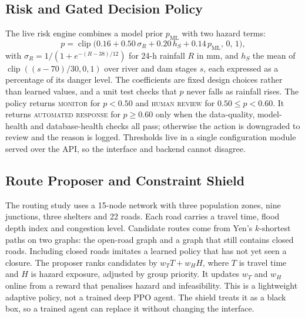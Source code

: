 \documentclass[conference]{IEEEtran}
\begin{document}
\subsection{Risk and Gated Decision Policy}
The live risk engine combines a model prior $p_{\mathrm{ML}}$ with two hazard terms:
\begin{equation}
p=\operatorname{clip}\big(0.16+0.50\,\sigma_R+0.20\,h_S+0.14\,p_{\mathrm{ML}},\,0,\,1\big),
\label{eq:risk}
\end{equation}
with $\sigma_R=1/(1+e^{-(R-38)/12})$ for 24-h rainfall $R$ in mm, and $h_S$ the mean of $\operatorname{clip}((s-70)/30,0,1)$ over river and dam stages $s$, each expressed as a percentage of its danger level. The coefficients are fixed design choices rather than learned values, and a unit test checks that $p$ never falls as rainfall rises. The policy returns \textsc{monitor} for $p<0.50$ and \textsc{human review} for $0.50\le p<0.60$. It returns \textsc{automated response} for $p\ge0.60$ only when the data-quality, model-health and database-health checks all pass; otherwise the action is downgraded to review and the reason is logged. Thresholds live in a single configuration module served over the API, so the interface and backend cannot disagree.

\subsection{Route Proposer and Constraint Shield}
The routing study uses a 15-node network with three population zones, nine junctions, three shelters and 22 roads. Each road carries a travel time, flood depth index and congestion level. Candidate routes come from Yen's $k$-shortest paths on two graphs: the open-road graph and a graph that still contains closed roads. Including closed roads imitates a learned policy that has not yet seen a closure. The proposer ranks candidates by $w_T T + w_H H$, where $T$ is travel time and $H$ is hazard exposure, adjusted by group priority. It updates $w_T$ and $w_H$ online from a reward that penalises hazard and infeasibility. This is a lightweight adaptive policy, not a trained deep PPO agent. The shield treats it as a black box, so a trained agent can replace it without changing the interface.
\end{document}
